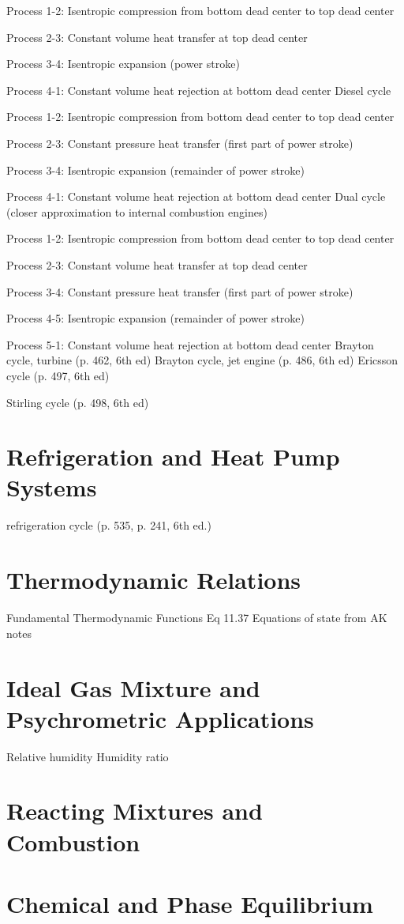 \documentclass[paper=letter, fontsize=11pt]{scrartcl}
\numberwithin{equation}{section}        %
\numberwithin{figure}{section}          %
\numberwithin{table}{section}               %
\begin{document}
Process 1-2: Isentropic compression from bottom dead center to top dead center

Process 2-3: Constant volume heat transfer at top dead center

Process 3-4: Isentropic expansion (power stroke)

Process 4-1: Constant volume heat rejection at bottom dead center
\newline
\newline
Diesel cycle

Process 1-2: Isentropic compression from bottom dead center to top dead center

Process 2-3: Constant pressure heat transfer (first part of power stroke)

Process 3-4: Isentropic expansion (remainder of power stroke)

Process 4-1: Constant volume heat rejection at bottom dead center
\newline
\newline
Dual cycle (closer approximation to internal combustion engines)

Process 1-2: Isentropic compression from bottom dead center to top dead center

Process 2-3: Constant volume heat transfer at top dead center

Process 3-4: Constant pressure heat transfer (first part of power stroke)

Process 4-5: Isentropic expansion (remainder of power stroke)

Process 5-1: Constant volume heat rejection at bottom dead center
\newline
\newline
Brayton cycle, turbine (p. 462, 6th ed)
Brayton cycle, jet engine (p. 486, 6th ed)
\newline
\newline
Ericsson cycle (p. 497, 6th ed)

Stirling cycle (p. 498, 6th ed)


\newpage
\section{Refrigeration and Heat Pump Systems}

refrigeration cycle (p. 535, p. 241, 6th ed.)


\newpage
\section{Thermodynamic Relations}

Fundamental Thermodynamic Functions Eq 11.37
Equations of state from AK notes


\newpage
\section{Ideal Gas Mixture and Psychrometric Applications}

Relative humidity
Humidity ratio


\newpage
\section{Reacting Mixtures and Combustion}

\section{Chemical and Phase Equilibrium}

\end{document}
